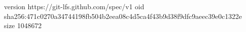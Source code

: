 version https://git-lfs.github.com/spec/v1
oid sha256:471c0270a34744198fb504b2eea08c4d5ca4f43b9d38f9dfc9aeec39e0c1322e
size 1048672
